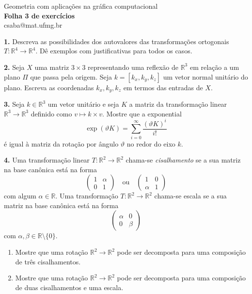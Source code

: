 \documentclass{amsart}
\newcommand{\R}{\mathbb R}
\begin{document}
\begin{center}
\large Geometria com aplicações na gráfica computacional\\
{\bf\large Folha 3 de exercícios}\\
csaba@mat.ufmg.br
\end{center}


\bigskip

{\bf 1.} Descreva as possibilidades dos autovalores das transformações ortogonais $T:\R^4\to\R^4$. 
Dê exemplos com justificativas para todos os casos.

\medskip

{\bf 2.} Seja $X$ uma matriz $3\times 3$ representando uma reflexão de $\R^3$ em relação a um plano
$\Pi$
que passa pela origem. Seja $k=[k_x,k_y,k_z]$ um vetor normal unitário do plano.  Escreva 
as coordenadas $k_x,k_y,k_z$ em termos das entradas de $X$.

    \medskip

{\bf 3.} Seja $k\in\R^3$ um vetor unitário e seja $K$ a matriz da transformação linear 
$\R^3\to\R^3$ definido como $v\mapsto k\times v$. Mostre que a exponential 
\[
    \exp(\vartheta K)=\sum_{i=0}^\infty \frac{(\vartheta K)^i}{i!}
\]
é igual à matriz da rotação por ângulo $\vartheta$ no redor do eixo $k$.
\medskip


{\bf 4.} Uma transformação linear $T:\R^2\to\R^2$ chama-se \emph{cisalhamento} se a sua matriz na base canônica  está na forma 
\[
    \begin{pmatrix} 1 & \alpha \\ 0 & 1\end{pmatrix} \quad\mbox{ou}\quad 
    \begin{pmatrix} 1 & 0 \\ \alpha & 1\end{pmatrix}
\]
com algum $\alpha\in\R$. Uma transformação $T:\R^2\to\R^2$ chama-se escala se 
a sua matriz na base canônica está na forma 
\[
    \begin{pmatrix} \alpha & 0 \\ 0 &\beta\end{pmatrix}
\]
com $\alpha,\beta\in\R\setminus\{0\}$. 
\begin{enumerate}
    \item Mostre que uma rotação $\R^2\to\R^2$ pode ser decomposta para uma composição de três 
    cisalhamentos.
    \item Mostre que uma rotação $\R^2\to\R^2$ pode ser decomposta para uma composição de duas 
    cisalhamentos e uma escala.
\end{enumerate}
\end{document}
